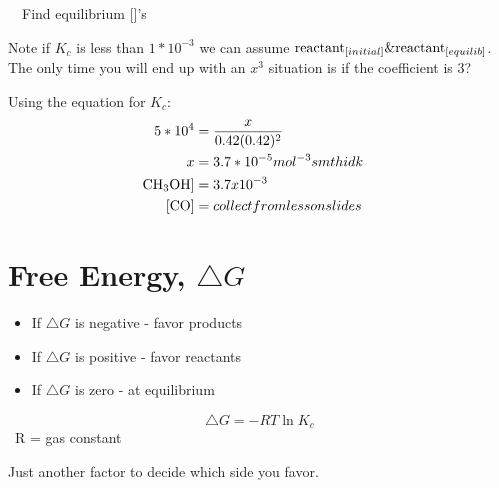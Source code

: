 \documentclass{article}
\begin{document}
\ \ Find equilibrium []'s

Note if $K_{c}$ is less than $1*10^{-3}$ we can assume $\ce{reactant}_{[initial]} \& \ce{reactant}_{[equilib]}$. The only time you will end up with an $x^{3}$ situation is if the coefficient is 3?

Using the equation for $K_{c}$:
\begin{align*}
5*10^{4} &= \frac{x}{0.42(0.42)^{2}}\\
x &= 3.7*10^{-5}mol^{-3} smth idk \\
\ce{CH3OH]} &= 3.7x10^{-3}\\
\ce{[CO]} &=
collect from lesson slides &
\end{align*}



\section{Free Energy, $\triangle{G}$}
\begin{itemize}
\item If $\triangle{G}$ is negative - favor products
\item If $\triangle{G}$ is positive - favor reactants
\item If $\triangle{G}$ is zero - at equilibrium
\end{itemize}

$$\triangle{G} = -RT\ln{K_{c}}$$\ R = gas constant

Just another factor to decide which side you favor.
\end{document}
